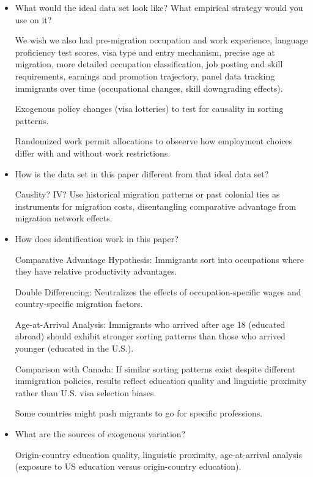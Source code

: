 \documentclass{article}
\begin{document}
\begin{itemize}
    \begin{itemize}
        \item What would the ideal data set look like? What empirical strategy would you use on it?
        
        We wish we also had pre-migration occupation and work experience, language proficiency test scores, visa type and entry mechanism, precise age at migration, more detailed occupation classification, job posting and skill requirements, earnings and promotion trajectory, panel data tracking immigrants over time (occupational changes, skill downgrading effects).

        Exogenous policy changes (visa lotteries) to test for causality in sorting patterns.

        Randomized work permit allocations to obseerve how employment choices differ with and without work restrictions.

        \item How is the data set in this paper different from that ideal data set?
        
        Causlity? IV? Use historical migration patterns or past colonial ties as instruments for migration costs, disentangling comparative advantage from migration network effects.

        \item How does identification work in this paper?
        
        Comparative Advantage Hypothesis: Immigrants sort into occupations where they have relative productivity advantages.
        
        Double Differencing: Neutralizes the effects of occupation-specific wages and country-specific migration factors.
        
        Age-at-Arrival Analysis: Immigrants who arrived after age 18 (educated abroad) should exhibit stronger sorting patterns than those who arrived younger (educated in the U.S.).

        Comparison with Canada: If similar sorting patterns exist despite different immigration policies, results reflect education quality and linguistic proximity rather than U.S. visa selection biases.

        Some countries might push migrants to go for specific professions. 

        \item What are the sources of exogenous variation?
        
        Origin-country education quality, linguistic proximity, age-at-arrival analysis (exposure to US education versus origin-country education).


\end{itemize}
\end{itemize}
\end{document}
